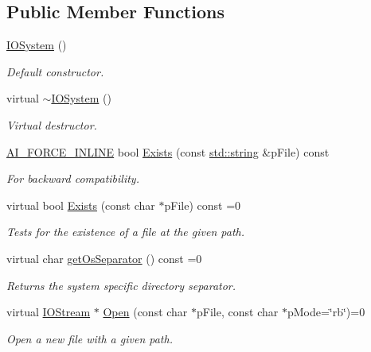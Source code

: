 \subsection*{Public Member Functions}
\begin{DoxyCompactItemize}
\item 
\hyperlink{class_assimp_1_1_i_o_system_af8ba1ee2dc0686da8fc9e3dad49af801}{I\-O\-System} ()
\begin{DoxyCompactList}\small\item\em Default constructor. \end{DoxyCompactList}\item 
virtual \hyperlink{class_assimp_1_1_i_o_system_a617417f1c5125770606fea3b41068b36}{$\sim$\-I\-O\-System} ()
\begin{DoxyCompactList}\small\item\em Virtual destructor. \end{DoxyCompactList}\item 
\hyperlink{ai_defines_8h_a61d239a320b58eca56bacc46fc2c79b8}{A\-I\-\_\-\-F\-O\-R\-C\-E\-\_\-\-I\-N\-L\-I\-N\-E} bool \hyperlink{class_assimp_1_1_i_o_system_a7ae6cfaea4957408967463bfc3b84b27}{Exists} (const \hyperlink{glew_8h_ae84541b4f3d8e1ea24ec0f466a8c568b}{std\-::string} \&p\-File) const 
\begin{DoxyCompactList}\small\item\em For backward compatibility. \end{DoxyCompactList}\item 
virtual bool \hyperlink{class_assimp_1_1_i_o_system_a79f5fe8d2dbe1056c9418f7de9a72445}{Exists} (const char $\ast$p\-File) const =0
\begin{DoxyCompactList}\small\item\em Tests for the existence of a file at the given path. \end{DoxyCompactList}\item 
virtual char \hyperlink{class_assimp_1_1_i_o_system_a40e412875b985bdb638f00ef0f20fff6}{get\-Os\-Separator} () const =0
\begin{DoxyCompactList}\small\item\em Returns the system specific directory separator. \end{DoxyCompactList}\item 
virtual \hyperlink{class_assimp_1_1_i_o_stream}{I\-O\-Stream} $\ast$ \hyperlink{class_assimp_1_1_i_o_system_ac512ece3b0701de5682553007a4c0816}{Open} (const char $\ast$p\-File, const char $\ast$p\-Mode=\char`\"{}rb\char`\"{})=0
\begin{DoxyCompactList}\small\item\em Open a new file with a given path. \end{DoxyCompactList}\item 

\end{DoxyCompactItemize}
